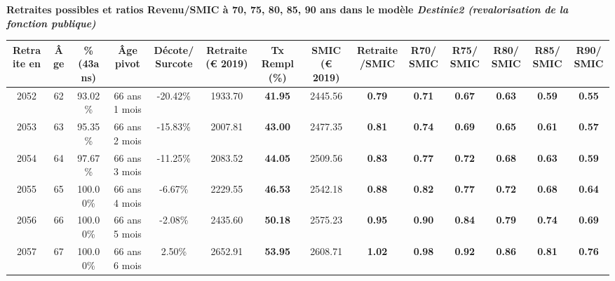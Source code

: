  \vspace{0.1cm} 
{\bf \noindent Retraites possibles et ratios Revenu/SMIC à 70, 75, 80, 85, 90 ans dans le modèle \emph{Destinie2 (revalorisation de la fonction publique)}}  
 
\begin{adjustbox}{max width=\textwidth} 
\begin{tabular}[htb]{|c|c||c|c|c||c|c||c|c||c|c|c|c|c|} 
\hline 
 Retraite en &  Âge &  \%(43ans) &  Âge pivot &  Décote/Surcote &  Retraite (\euro{} 2019) &  Tx Rempl(\%) &  SMIC (\euro{} 2019) &  Retraite/SMIC &  R70/SMIC &  R75/SMIC &  R80/SMIC &  R85/SMIC &  R90/SMIC \\ 
\hline \hline 
 2052 &  62 &  93.02\% &  66 ans 1 mois &  -20.42\% &  1933.70 &  {\bf 41.95} &  2445.56 &  {\bf {\color{red} 0.79}} &  {\bf {\color{red} 0.71}} &  {\bf {\color{red} 0.67}} &  {\bf {\color{red} 0.63}} &  {\bf {\color{red} 0.59}} &  {\bf {\color{red} 0.55}} \\ 
\hline 
 2053 &  63 &  95.35\% &  66 ans 2 mois &  -15.83\% &  2007.81 &  {\bf 43.00} &  2477.35 &  {\bf {\color{red} 0.81}} &  {\bf {\color{red} 0.74}} &  {\bf {\color{red} 0.69}} &  {\bf {\color{red} 0.65}} &  {\bf {\color{red} 0.61}} &  {\bf {\color{red} 0.57}} \\ 
\hline 
 2054 &  64 &  97.67\% &  66 ans 3 mois &  -11.25\% &  2083.52 &  {\bf 44.05} &  2509.56 &  {\bf {\color{red} 0.83}} &  {\bf {\color{red} 0.77}} &  {\bf {\color{red} 0.72}} &  {\bf {\color{red} 0.68}} &  {\bf {\color{red} 0.63}} &  {\bf {\color{red} 0.59}} \\ 
\hline 
 2055 &  65 &  100.00\% &  66 ans 4 mois &  -6.67\% &  2229.55 &  {\bf 46.53} &  2542.18 &  {\bf {\color{red} 0.88}} &  {\bf {\color{red} 0.82}} &  {\bf {\color{red} 0.77}} &  {\bf {\color{red} 0.72}} &  {\bf {\color{red} 0.68}} &  {\bf {\color{red} 0.64}} \\ 
\hline 
 2056 &  66 &  100.00\% &  66 ans 5 mois &  -2.08\% &  2435.60 &  {\bf 50.18} &  2575.23 &  {\bf {\color{red} 0.95}} &  {\bf {\color{red} 0.90}} &  {\bf {\color{red} 0.84}} &  {\bf {\color{red} 0.79}} &  {\bf {\color{red} 0.74}} &  {\bf {\color{red} 0.69}} \\ 
\hline 
 2057 &  67 &  100.00\% &  66 ans 6 mois &  2.50\% &  2652.91 &  {\bf 53.95} &  2608.71 &  {\bf 1.02} &  {\bf {\color{red} 0.98}} &  {\bf {\color{red} 0.92}} &  {\bf {\color{red} 0.86}} &  {\bf {\color{red} 0.81}} &  {\bf {\color{red} 0.76}} \\ 
\hline 
\hline 
\end{tabular} 
\end{adjustbox} 
 
